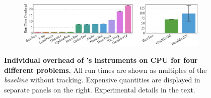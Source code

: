 \begin{figure}[p]
\begin{subfigure}[t]{\linewidth}
    \includegraphics{../repos/cockpit-paper/fig/01_benchmark/output/fig_individual/benchmark_combined_fmnist_2c2d_cpu_thesis-wide}
    \label{cockpit::fig:app_benchmark_instruments_cpu-fmnist}
  \end{subfigure}
  \vfill
  \caption{\textbf{Individual overhead of \cockpittitle's instruments on CPU for
      four different problems.} All run times are shown as multiples of the
    \emph{baseline} without tracking. Expensive quantities are displayed in
    separate panels on the right. Experimental details in the text.}
  \label{cockpit::fig:app_benchmark_instruments_cpu}
\end{figure}

\captionsetup[subfigure]{justification=centering, singlelinecheck=true}

